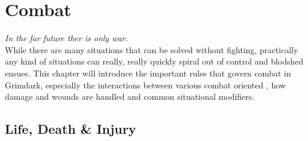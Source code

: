 \chapter{Combat}
\textit{In the far future ther is only war.}\\
While there are many situations that can be solved without fighting, practically any kind of situations can really, really quickly spiral out of control and blodshed ensues. 
This chapter will introduce the important rules that govern combat in Grimdark, especially the interactions between various combat oriented , how damage and wounds are handled and common situational modifiers.

\section{Life, Death \& Injury}
